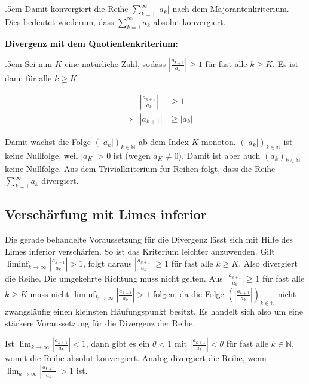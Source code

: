 \documentclass[fontsize=9pt,
               parskip=half-,
               DIV=14,
               listof=chapterentry,
               tocflat]{scrbook}
\newenvironment{indentblock}{\begin{adjustwidth}{.5cm}{}}{\end{adjustwidth}}
\newcommand{\proofstep}[1]{\textbf{\textcolor{Black}{#1}}}
\begin{document}
\begin{proof*}
\begin{indentblock}
Damit konvergiert die Reihe $\sum _{k=1}^{\infty }|a_{k}|$ nach dem Majorantenkriterium. Dies bedeutet wiederum, dass $\sum _{k=1}^{\infty }a_{k}$ absolut konvergiert.

\end{indentblock}

\proofstep{Divergenz mit dem Quotientenkriterium:}
 \begin{indentblock}
Sei nun $K$ eine natürliche Zahl, sodass $\left|{\tfrac {a_{k+1}}{a_{k}}}\right|\geq 1$ für fast alle $k\geq K$. Es ist dann für alle $k\geq K$:

\begin{align*}
&&\left|{\frac {a_{k+1}}{a_{k}}}\right|&\geq 1\\[0.5em]&\Rightarrow &|a_{k+1}|&\geq |a_{k}|
\end{align*}

Damit wächst die Folge $\left(|a_{k}|\right)_{k\in \mathbb {N} }$ ab dem Index $K$ monoton. $\left(|a_{k}|\right)_{k\in \mathbb {N} }$ ist keine Nullfolge, weil $|a_{K}|>0$ ist (wegen $a_{K}\neq 0$). Damit ist aber auch $\left(a_{k}\right)_{k\in \mathbb {N} }$ keine Nullfolge. Aus dem Trivialkriterium für Reihen folgt, dass die Reihe $\sum _{k=1}^{\infty }a_{k}$ divergiert.

\end{indentblock}

\end{proof*}

\subsection{Verschärfung mit Limes inferior}

Die gerade behandelte Voraussetzung für die Divergenz lässt sich mit Hilfe des Limes inferior verschärfen. So ist das Kriterium leichter anzuwenden. Gilt $\liminf _{k\to \infty }\left|{\tfrac {a_{k+1}}{a_{k}}}\right|>1$, folgt daraus $\left|{\tfrac {a_{k+1}}{a_{k}}}\right|\geq 1$ für fast alle $k\geq K$. Also divergiert die Reihe. Die umgekehrte Richtung muss nicht gelten. Aus $\left|{\tfrac {a_{k+1}}{a_{k}}}\right|\geq 1$ für fast alle $k\geq K$ muss nicht $\liminf _{k\to \infty }\left|{\tfrac {a_{k+1}}{a_{k}}}\right|>1$ folgen, da die Folge $\left(\left|{\tfrac {a_{k+1}}{a_{k}}}\right|\right)_{k\in \mathbb {N} }$ nicht zwangsläufig einen kleinsten Häufungspunkt besitzt. Es handelt sich also um eine stärkere Voraussetzung für die Divergenz der Reihe.

\begin{hint*}
Ist $\lim _{k\to \infty }\left|{\tfrac {a_{k+1}}{a_{k}}}\right|<1$, dann gibt es ein $\theta <1$ mit $\left|{\tfrac {a_{k+1}}{a_{k}}}\right|<\theta $ für fast alle $k\in \mathbb {N} $, womit die Reihe absolut konvergiert. Analog divergiert die Reihe, wenn $\lim _{k\to \infty }\left|{\tfrac {a_{k+1}}{a_{k}}}\right|>1$ ist.

\end{hint*}
\end{document}
